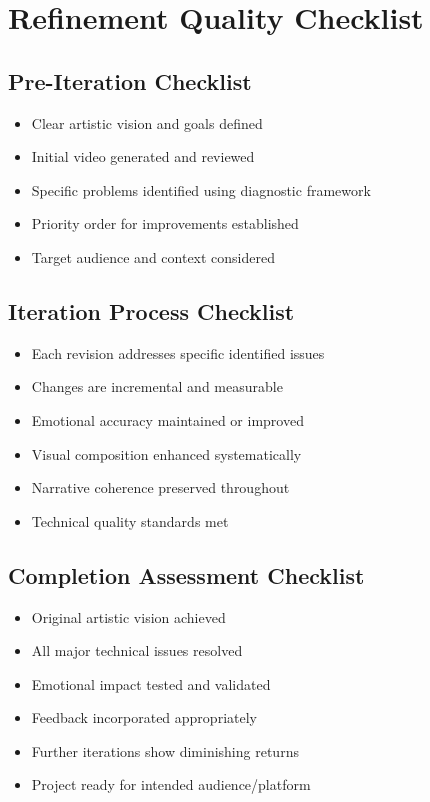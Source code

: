\section*{Refinement Quality Checklist}

\subsection*{Pre-Iteration Checklist}
\begin{itemize}
\item[$\square$] Clear artistic vision and goals defined
\item[$\square$] Initial video generated and reviewed
\item[$\square$] Specific problems identified using diagnostic framework
\item[$\square$] Priority order for improvements established
\item[$\square$] Target audience and context considered
\end{itemize}

\subsection*{Iteration Process Checklist}
\begin{itemize}
\item[$\square$] Each revision addresses specific identified issues
\item[$\square$] Changes are incremental and measurable
\item[$\square$] Emotional accuracy maintained or improved
\item[$\square$] Visual composition enhanced systematically
\item[$\square$] Narrative coherence preserved throughout
\item[$\square$] Technical quality standards met
\end{itemize}

\subsection*{Completion Assessment Checklist}
\begin{itemize}
\item[$\square$] Original artistic vision achieved
\item[$\square$] All major technical issues resolved
\item[$\square$] Emotional impact tested and validated
\item[$\square$] Feedback incorporated appropriately
\item[$\square$] Further iterations show diminishing returns
\item[$\square$] Project ready for intended audience/platform
\end{itemize}

